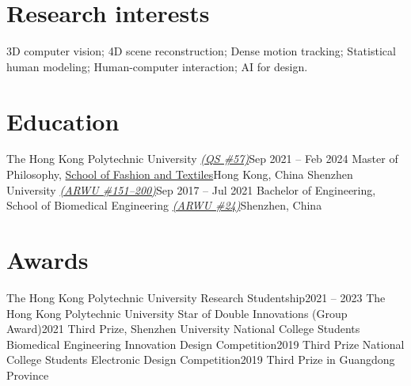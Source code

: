 \documentclass[letterpaper,11pt]{article}
\begin{document}
    \maketitle

    \section{Research interests}
    
    3D computer vision; 4D scene reconstruction; Dense motion tracking; Statistical human modeling; Human-computer interaction; AI for design.

    \section{Education}

    \resumeColumnsStart
        \resumeEntry
            {The Hong Kong Polytechnic University
            \href{https://www.topuniversities.com/world-university-rankings/2025?page=3}{\textsl{(QS \#57)}}}{Sep 2021 -- Feb 2024}
            {Master of Philosophy, \href{https://www.polyu.edu.hk/sft/}{School of Fashion and Textiles}}{Hong Kong, China}
        \resumeEntry
            {Shenzhen University
            \href{https://www.shanghairanking.com/institution/shenzhen-university}{\textsl{(ARWU \#151--200)}}}{Sep 2017 -- Jul 2021}
            {Bachelor of Engineering, School of Biomedical Engineering
            \href{https://www.shanghairanking.com/rankings/gras/2023/RS0208}{\textsl{(ARWU \#24)}}}{Shenzhen, China}
    \resumeColumnsEnd

    \section{Awards}

    \resumeColumnsStart
        \resumeEntry
            {The Hong Kong Polytechnic University Research Studentship}{2021 -- 2023}
            {The Hong Kong Polytechnic University}{}
        \resumeEntry
            {Star of Double Innovations (Group Award)}{2021}
            {Third Prize, Shenzhen University}{}
        \resumeEntry
            {National College Students Biomedical Engineering Innovation Design Competition}{2019}
            {Third Prize}{}
        \resumeEntry
            {National College Students Electronic Design Competition}{2019}
            {Third Prize in Guangdong Province}{}
    \resumeColumnsEnd
\end{document}
